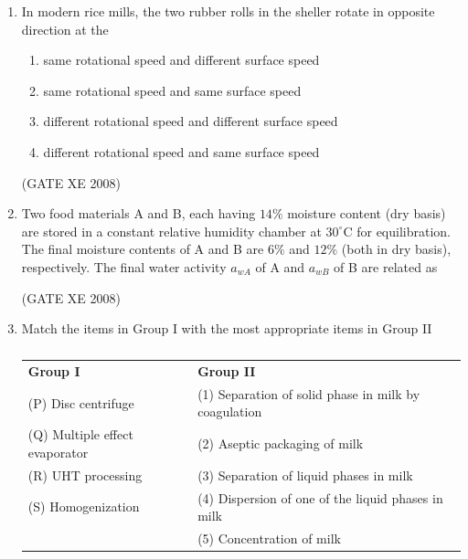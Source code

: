 \documentclass[12pt]{article}
\begin{document}
\begin{enumerate}
(GATE XE 2008)

\item In modern rice mills, the two rubber rolls in the sheller rotate in opposite direction at the  

\begin{enumerate}
\item  same rotational speed and different surface speed 
\item  same rotational speed and same surface speed  
\item  different rotational speed and different surface speed  
\item  different rotational speed and same surface speed  
\end{enumerate}

(GATE XE 2008)  

\item Two food materials A and B, each having $14\%$ moisture content (dry basis) are stored in a constant relative humidity chamber at $30^{\circ} \mathrm{C}$ for equilibration. The final moisture contents of A and B are $6\%$ and $12\%$ (both in dry basis), respectively. The final water activity $a_{wA}$ of A and $a_{wB}$ of B are related as  

\begin{enumerate}
\end{enumerate}

(GATE XE 2008)  

\item Match the items in Group I with the most appropriate items in Group II  

\begin{table}[H]     \centering     \caption{}     \label{}     \begin{tabular}{p{7cm} p{7cm}}
\textbf{Group I} & \textbf{Group II} \\
(P) Disc centrifuge & (1) Separation of solid phase in milk by coagulation \\
(Q) Multiple effect evaporator & (2) Aseptic packaging of milk \\
(R) UHT processing & (3) Separation of liquid phases in milk \\
(S) Homogenization & (4) Dispersion of one of the liquid phases in milk \\
& (5) Concentration of milk \\
\end{tabular} \end{table}  


\end{enumerate}
\end{document}
